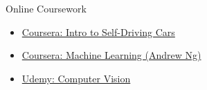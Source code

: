 



{\large\color{emphasis}Online Coursework\par}
\smallskip
\begin{itemize}
\item \href{https://www.coursera.org/account/accomplishments/records/HPCUJFQWZJHB}{Coursera: Intro to Self-Driving Cars}
\item \href{https://www.coursera.org/account/accomplishments/records/AELG6KXXJ88V}{Coursera: Machine Learning (Andrew Ng)}
\item \href{https://www.udemy.com/certificate/UC-TJRJ90AG/}{Udemy: Computer Vision}
\end{itemize}

